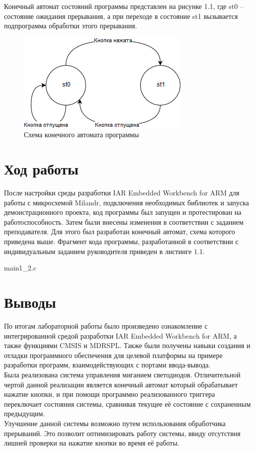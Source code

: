 \documentclass[14pt,a4paper,report]{report}
\begin{document}
Конечный автомат состояний программы представлен на рисунке 1.1, где st0 – состояние ожидания прерывания, а при переходе в состояние st1 вызывается подпрограмма обработки этого прерывания.

\begin{figure}[h!]
	\centering
	\includegraphics[scale = 1]{img/1_1.png}
	\caption{Схема конечного автомата программы}
\end{figure}

\section{Ход работы}

После настройки среды разработки IAR Embedded Workbench for ARM для работы с микросхемой Milandr, подключения необходимых библиотек и запуска демонстрационного проекта, код программы был запущен и протестирован на работоспособность. Затем были внесены изменения в соответствии с заданием преподавателя. Для этого был разработан конечный автомат, схема которого приведена выше. 
Фрагмент кода программы, разработанной в соответствии с индивидуальным заданием руководителя приведен в листинге 1.1. 


		{main1_2.c}


\section{Выводы}
По итогам лабораторной работы было произведено ознакомление с интегрированной средой разработки IAR Embedded Workbench for ARM, а также функциями CMSIS и MDRSPL. Также были получены навыки создания и отладки программного обеспечения для целевой платформы на примере разработки программ, взаимодействующих с портами ввода-вывода. \\
\indent Была реализована система управления миганием светодиодов. Отличительной чертой данной реализации является конечный автомат который обрабатывает нажатие кнопки, и при помощи программно реализованного триггера переключает состояния системы, сравнивая текущее её состояние с сохраненным предыдущим. \\
\indent Улучшение данной системы возможно путем использования обработчика прерываний. Это позволит оптимизировать работу системы, ввиду отсутствия лишней проверки на нажатие кнопки во время её работы.
\end{document}

